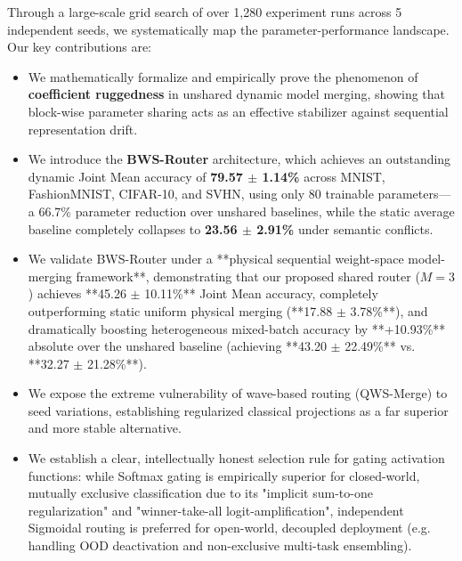 Through a large-scale grid search of over 1,280 experiment runs across 5 independent seeds, we systematically map the parameter-performance landscape. Our key contributions are:
\begin{itemize}
    \item We mathematically formalize and empirically prove the phenomenon of \textbf{coefficient ruggedness} in unshared dynamic model merging, showing that block-wise parameter sharing acts as an effective stabilizer against sequential representation drift.
    \item We introduce the \textbf{BWS-Router} architecture, which achieves an outstanding dynamic Joint Mean accuracy of \textbf{79.57 $\pm$ 1.14\%} across MNIST, FashionMNIST, CIFAR-10, and SVHN, using only 80 trainable parameters---a 66.7\% parameter reduction over unshared baselines, while the static average baseline completely collapses to \textbf{23.56 $\pm$ 2.91\%} under semantic conflicts.
    \item We validate BWS-Router under a **physical sequential weight-space model-merging framework**, demonstrating that our proposed shared router ($M=3$) achieves **45.26 $\pm$ 10.11\%** Joint Mean accuracy, completely outperforming static uniform physical merging (**17.88 $\pm$ 3.78\%**), and dramatically boosting heterogeneous mixed-batch accuracy by **+10.93\%** absolute over the unshared baseline (achieving **43.20 $\pm$ 22.49\%** vs. **32.27 $\pm$ 21.28\%**).
    \item We expose the extreme vulnerability of wave-based routing (QWS-Merge) to seed variations, establishing regularized classical projections as a far superior and more stable alternative.
    \item We establish a clear, intellectually honest selection rule for gating activation functions: while Softmax gating is empirically superior for closed-world, mutually exclusive classification due to its "implicit sum-to-one regularization" and "winner-take-all logit-amplification", independent Sigmoidal routing is preferred for open-world, decoupled deployment (e.g. handling OOD deactivation and non-exclusive multi-task ensembling).
\end{itemize}
